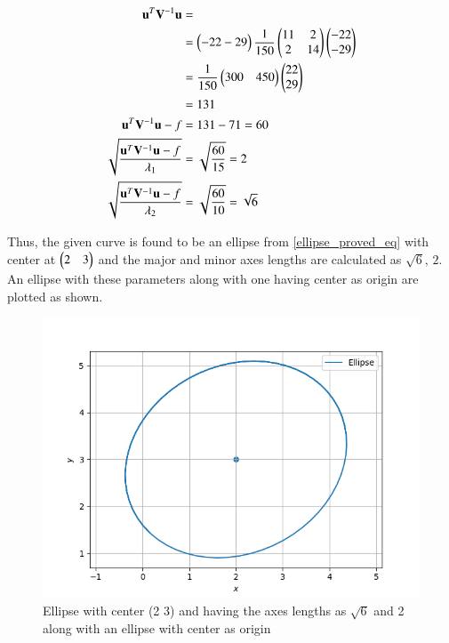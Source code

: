 \documentclass[journal,12pt,twocolumn]{IEEEtran}
\begin{document}
\begin{align}
\mathbf{u}^T\mathbf{V}^{-1}\mathbf{u} &= \nonumber \\
&= \begin{pmatrix}-22 -29\end{pmatrix}\frac{1}{150}\begin{pmatrix}11 & 2 \\ 2 &1 4 \end{pmatrix}\begin{pmatrix}-22 \\ -29\end{pmatrix} \nonumber \\
&= \frac{1}{150}\begin{pmatrix}300 & 450\end{pmatrix}\begin{pmatrix}22 \\ 29\end{pmatrix} \nonumber \\
&= 131 \nonumber \\
\mathbf{u}^T\mathbf{V}^{-1}\mathbf{u} -f &= 131 - 71 = 60 \\
\sqrt{\frac{\mathbf{u}^T\mathbf{V}^{-1}\mathbf{u} -f}{\lambda_1}} &= \sqrt{\frac{60}{15}} = 2 \\
\sqrt{\frac{\mathbf{u}^T\mathbf{V}^{-1}\mathbf{u} -f}{\lambda_2}} &= \sqrt{\frac{60}{10}} = \sqrt{6}
\end{align}

Thus, the given curve is found to be an ellipse from \eqref{ellipse_proved_eq} with center at $\begin{pmatrix}2 & 3\end{pmatrix}$ and the major and minor axes lengths are calculated as $\sqrt{6}$, $2$. An ellipse with these parameters along with one having center as origin are plotted as shown.

\begin{figure}[hb!]
\centering
\includegraphics[width=\columnwidth]{assignment_6_fig.png}
\caption{Ellipse with center (2 3) and having the axes lengths as $\sqrt{6}$ and 2 along with an ellipse with center as origin}
\label{Fig:Ellipse}
\end{figure}
\end{document}
